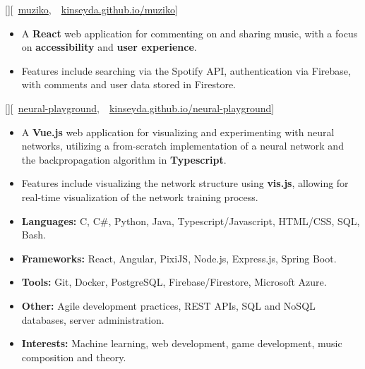 \documentclass{article}
\begin{document}
[][\faGithub\
	\href{https://github.com/kinseyda/muziko}{muziko},\
	\faGlobe\
	\href{https://kinseyda.github.io/muziko/}{kinseyda.github.io/muziko}]

\begin{itemize}
	\item A \textbf{React} web application for commenting on and sharing music,
	      with a focus on \textbf{accessibility} and \textbf{user experience}.
	\item Features include searching via the Spotify API, authentication via
	      Firebase, with comments and user data stored in Firestore.
\end{itemize}

\experience{Neural Playground}[][\faGithub\
	\href{https://github.com/kinseyda/neural-playground}{neural-playground},\
	\faGlobe\
	\href{https://kinseyda.github.io/neural-playground/}{kinseyda.github.io/neural-playground}]

\begin{itemize}
	\item A \textbf{Vue.js} web application for visualizing and experimenting
	      with neural networks, utilizing a from-scratch implementation of a
	      neural network and the backpropagation algorithm in
	      \textbf{Typescript}.
	\item Features include visualizing the network structure using
	      \textbf{vis.js}, allowing for real-time visualization of the network
	      training process.
\end{itemize}

\vspace*{\fill}

\fancySection{Skills}

\begin{itemize}
	\item \textbf{Languages:} C, C\#, Python, Java, Typescript/Javascript,
	      HTML/CSS, SQL, Bash.
	\item \textbf{Frameworks:} React, Angular, PixiJS, Node.js, Express.js,
	      Spring Boot.
	\item \textbf{Tools:} Git, Docker, PostgreSQL, Firebase/Firestore,
	      Microsoft Azure.
	\item \textbf{Other:} Agile development practices, REST APIs, SQL and NoSQL
	      databases, server administration.
	\item \textbf{Interests:} Machine learning, web development, game
	      development, music composition and theory.
\end{itemize}
\end{document}
